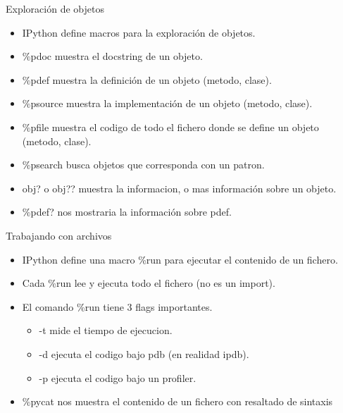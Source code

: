 \documentclass[10pt]{beamer}
\begin{document}
  \begin{frame}{Exploración de objetos}
    \begin{itemize}
      \item IPython define macros para la exploración de objetos.
      \item \%pdoc muestra el docstring de un objeto.
      \item \%pdef muestra la definición de un objeto (metodo, clase).
      \item \%psource muestra la implementación de un objeto (metodo, clase).
      \item \%pfile muestra el codigo de todo el fichero donde se define un objeto (metodo, clase).
      \item \%psearch busca objetos que corresponda con un patron.
      \item obj? o obj?? muestra la informacion, o mas información sobre un objeto.
      \item \%pdef? nos mostraria la información sobre pdef.
    \end{itemize}
  \end{frame}

  \begin{frame}{Trabajando con archivos}
    \begin{itemize}
      \item IPython define una macro \%run para ejecutar el contenido de un fichero.
      \item Cada \%run lee y ejecuta todo el fichero (no es un import).
      \item El comando \%run tiene 3 flags importantes.
      \begin{itemize}
        \item -t mide el tiempo de ejecucion.
        \item -d ejecuta el codigo bajo pdb (en realidad ipdb).
        \item -p ejecuta el codigo bajo un profiler.
      \end{itemize}
      \item \%pycat nos muestra el contenido de un fichero con resaltado de sintaxis
    \end{itemize}
  \end{frame}
\end{document}
